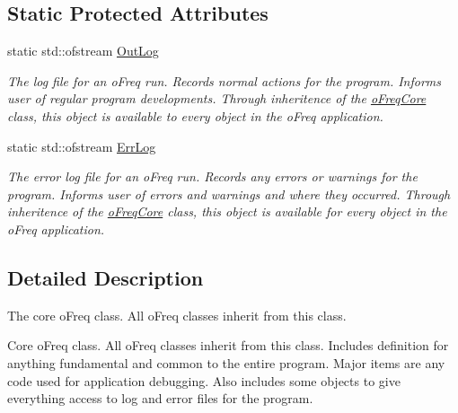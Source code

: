 \subsection*{Static Protected Attributes}
\begin{DoxyCompactItemize}
\item 
\hypertarget{classo_freq_core_a85b3e812b6d78c064ba375d5101bb053}{static std\-::ofstream \hyperlink{classo_freq_core_a85b3e812b6d78c064ba375d5101bb053}{Out\-Log}}\label{classo_freq_core_a85b3e812b6d78c064ba375d5101bb053}

\begin{DoxyCompactList}\small\item\em The log file for an o\-Freq run. Records normal actions for the program. Informs user of regular program developments. Through inheritence of the \hyperlink{classo_freq_core}{o\-Freq\-Core} class, this object is available to every object in the o\-Freq application. \end{DoxyCompactList}\item 
\hypertarget{classo_freq_core_a5e31044ee80fa436289e569c8080b21e}{static std\-::ofstream \hyperlink{classo_freq_core_a5e31044ee80fa436289e569c8080b21e}{Err\-Log}}\label{classo_freq_core_a5e31044ee80fa436289e569c8080b21e}

\begin{DoxyCompactList}\small\item\em The error log file for an o\-Freq run. Records any errors or warnings for the program. Informs user of errors and warnings and where they occurred. Through inheritence of the \hyperlink{classo_freq_core}{o\-Freq\-Core} class, this object is available for every object in the o\-Freq application. \end{DoxyCompactList}\end{DoxyCompactItemize}


\subsection{Detailed Description}
The core o\-Freq class. All o\-Freq classes inherit from this class. 

Core o\-Freq class. All o\-Freq classes inherit from this class. Includes definition for anything fundamental and common to the entire program. Major items are any code used for application debugging. Also includes some objects to give everything access to log and error files for the program. 

